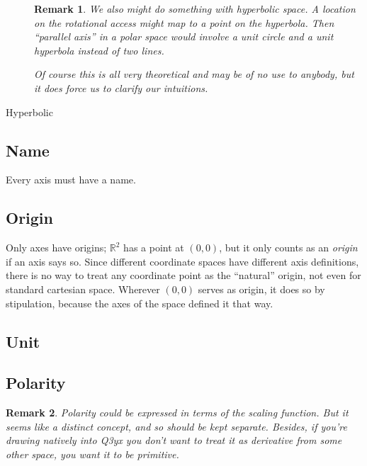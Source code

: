 \documentclass[12pt]{tufte-handout}
\numberwithin{equation}{subsection}
\numberwithin{equation}{subsection}
\newtheorem{remark}{Remark}
\newcommand\cspace{coordinate space}
\newcommand\Rtwo{\(\mathds{R}^2\)}
\begin{document}
\begin{description}
\begin{remark}
      We also might do something with hyperbolic space.  A location
      on the rotational access might map to a point on the
      hyperbola.  Then ``parallel axis'' in a polar space would
      involve a unit circle and a unit hyperbola instead of two
      lines.

      Of course this is all very theoretical and may be of no use to
      anybody, but it does force us to clarify our intuitions.
    \end{remark}

  \item[Hyperbolic]

  \end{description}

  \subsection{Name}
  \label{subs:axisname}

  Every axis must have a name.

  \subsection{Origin}
  \label{subs:axisorigin}

  Only axes have origins; \Rtwo{} has a point at \((0,0)\), but it only
  counts as an \textit{origin} if an axis says so.  Since
  different \cspace{}s have different axis definitions, there is no
  way to treat any coordinate point as the ``natural'' origin, not
  even for standard cartesian space.  Wherever \((0,0)\) serves as
  origin, it does so by stipulation, because the axes of the space
  defined it that way.

  \subsection{Unit}
  \label{subs:axisunit}


  \subsection{Polarity}
  \label{subs:polarity}

  \begin{remark}
    Polarity could be expressed in terms of the scaling function.  But
    it seems like a distinct concept, and so should be kept separate.
    Besides, if you're drawing natively into Q3yx you don't want to
    treat it as derivative from some other space, you want it to be
    primitive.
  \end{remark}
\end{document}

